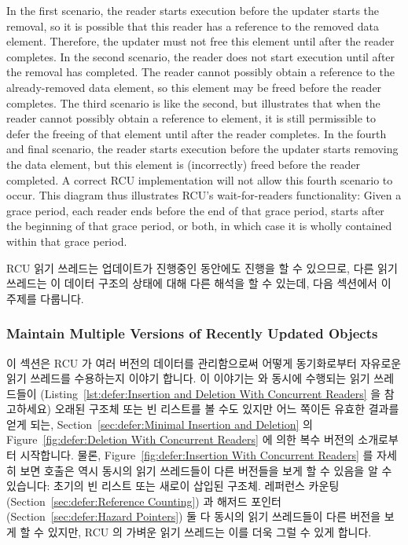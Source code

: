 In the first scenario, the reader starts execution before the
updater starts the removal, so it is possible that this reader
has a reference to the removed data element.
Therefore, the updater must not free this element until after the
reader completes.
In the second scenario, the reader does not start execution until
after the removal has completed.
The reader cannot possibly obtain a reference to the already-removed
data element, so this element may be freed before the reader completes.
The third scenario is like the second, but illustrates that when the
reader cannot possibly obtain a reference to element, it is still
permissible to defer the freeing of that element until after the
reader completes.
In the fourth and final scenario, the reader starts execution before
the updater starts removing the data element, but this element
is (incorrectly) freed before the reader completed.
A correct RCU implementation will not allow this fourth scenario to
occur.
This diagram thus illustrates RCU's wait-for-readers functionality:
Given a grace period, each reader ends before the end of that grace
period, starts after the beginning of that grace period, or both, in
which case it is wholly contained within that grace period.

\fi

RCU 읽기 쓰레드는 업데이트가 진행중인 동안에도 진행을 할 수 있으므로, 다른 읽기
쓰레드는 이 데이터 구조의 상태에 대해 다른 해석을 할 수 있는데, 다음 섹션에서
이 주제를 다룹니다.

\subsubsection{Maintain Multiple Versions of Recently Updated Objects}
\label{sec:defer:Maintain Multiple Versions of Recently Updated Objects}

이 섹션은 RCU 가 여러 버전의 데이터를 관리함으로써 어떻게 동기화로부터 자유로운
읽기 쓰레드를 수용하는지 이야기 합니다.
이 이야기는  와 동시에 수행되는 읽기 쓰레드들이
(Listing~\ref{lst:defer:Insertion and Deletion With Concurrent Readers} 을
참고하세요) 오래된  구조체 또는 빈 리스트를 볼 수도 있지만 어느 쪽이든
유효한 결과를 얻게 되는,
Section~\ref{sec:defer:Minimal Insertion and Deletion} 의
Figure~\ref{fig:defer:Deletion With Concurrent Readers} 에 의한 복수 버전의
소개로부터 시작합니다.
물론,
Figure~\ref{fig:defer:Insertion With Concurrent Readers}
를 자세히 보면  호출은 역시 동시의 읽기 쓰레드들이 다른
버전들을 보게 할 수 있음을 알 수 있습니다: 초기의 빈 리스트 또는 새로이 삽입된
 구조체.
레퍼런스 카운팅
(Section~\ref{sec:defer:Reference Counting})
과 해저드 포인터
(Section~\ref{sec:defer:Hazard Pointers})
둘 다 동시의 읽기 쓰레드들이 다른 버전을 보게 할 수 있지만, RCU 의 가벼운 읽기
쓰레드는 이를 더욱 그럴 수 있게 합니다.


